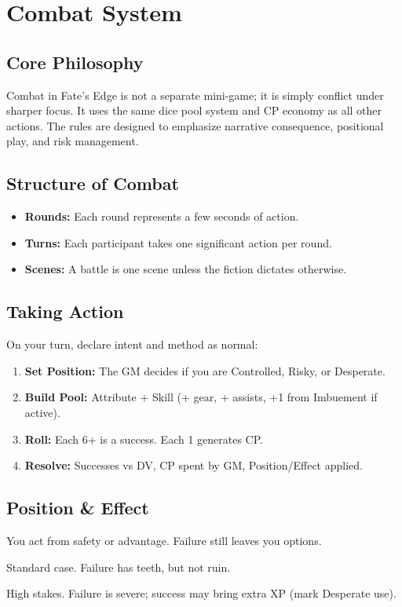 

\section{Combat System}

\subsection{Core Philosophy}
Combat in Fate's Edge is not a separate mini-game; it is simply conflict under sharper focus. 
It uses the same dice pool system and CP economy as all other actions. 
The rules are designed to emphasize narrative consequence, positional play, and risk management.

\subsection{Structure of Combat}
\begin{itemize}
  \item \textbf{Rounds:} Each round represents a few seconds of action.
  \item \textbf{Turns:} Each participant takes one significant action per round.
  \item \textbf{Scenes:} A battle is one scene unless the fiction dictates otherwise.
\end{itemize}

\subsection{Taking Action}
On your turn, declare intent and method as normal:
\begin{enumerate}
  \item \textbf{Set Position:} The GM decides if you are Controlled, Risky, or Desperate.
  \item \textbf{Build Pool:} Attribute + Skill (+ gear, + assists, +1 from Imbuement if active).
  \item \textbf{Roll:} Each 6+ is a success. Each 1 generates CP.
  \item \textbf{Resolve:} Successes vs DV, CP spent by GM, Position/Effect applied.
\end{enumerate}

\subsection{Position \& Effect}
\begin{description}[leftmargin=1.5em]
  \item[Controlled] You act from safety or advantage. Failure still leaves you options.
  \item[Risky] Standard case. Failure has teeth, but not ruin.
  \item[Desperate] High stakes. Failure is severe; success may bring extra XP (mark Desperate use).
\end{description}

